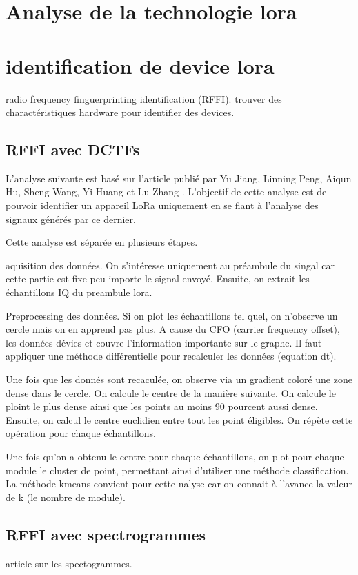 \section{Analyse de la technologie lora}



\section{identification de device lora}

radio frequency finguerprinting identification (RFFI). trouver des charactéristiques hardware pour identifier des devices.

\subsection{RFFI avec DCTFs}

L'analyse suivante est basé sur l'article publié par Yu Jiang, Linning Peng, Aiqun Hu, Sheng Wang, Yi Huang et Lu Zhang \cite{loraDCTF}. L'objectif de cette analyse est de pouvoir identifier un appareil LoRa uniquement en se fiant à l'analyse des signaux générés par ce dernier. 

Cette analyse est séparée en plusieurs étapes. 

aquisition des données. On s'intéresse uniquement au préambule du singal car cette partie est fixe peu importe le signal envoyé. Ensuite, on extrait les échantillons IQ du preambule lora.

Preprocessing des données. Si on plot les échantillons tel quel, on n'observe un cercle mais on en apprend pas plus. A cause du CFO (carrier frequency offset), les données dévies et couvre l'information importante sur le graphe. Il faut appliquer une méthode différentielle pour recalculer les données (equation dt).

Une fois que les donnés sont recaculée, on observe via un gradient coloré une zone dense dans le cercle. On calcule le centre de la manière suivante. On calcule le ploint le plus dense ainsi que les points au moins 90 pourcent aussi dense. Ensuite, on calcul le centre euclidien  entre tout les point éligibles. On répète cette opération pour chaque échantillons.

Une fois qu'on a obtenu le centre pour chaque échantillons, on plot pour chaque module le cluster de point, permettant ainsi d'utiliser une méthode classification. La méthode kmeans convient pour cette nalyse car on connait à l'avance la valeur de k (le nombre de module).

\subsection{RFFI avec spectrogrammes}
article sur les spectogrammes.